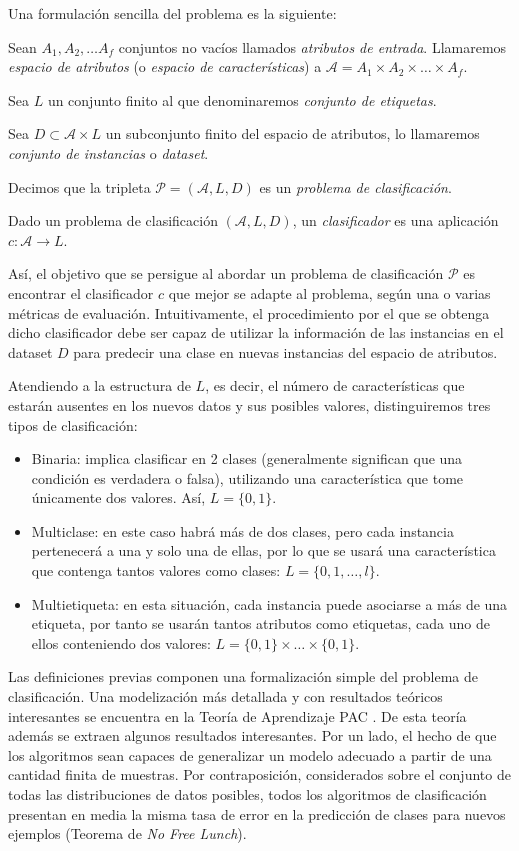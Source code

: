 Una formulación sencilla del problema es la siguiente:

Sean \(A_1, A_2, \dots A_f\) conjuntos no vacíos llamados
\emph{atributos de entrada}. Llamaremos \emph{espacio de atributos} (o
\emph{espacio de características}) a
\(\mathcal A=A_1\times A_2\times\dots\times A_f\).

Sea $L$ un conjunto finito al que denominaremos \emph{conjunto de etiquetas}.

Sea \(D\subset \mathcal A\times L\) un subconjunto finito del espacio de
atributos, lo llamaremos \emph{conjunto de instancias} o \emph{dataset}.

Decimos que la tripleta \(\mathcal P=\left(\mathcal A, L, D\right)\) es
un \emph{problema de clasificación}. 

Dado un problema de clasificación \(\left(\mathcal A, L, D\right)\), un
\emph{clasificador} es una aplicación \(c:\mathcal A\rightarrow L\).

Así, el objetivo que se persigue al abordar un problema de clasificación
\(\mathcal P\) es encontrar el clasificador \(c\) que mejor se adapte al
problema, según una o varias métricas de evaluación. Intuitivamente, el
procedimiento por el que se obtenga dicho clasificador debe ser capaz de
utilizar la información de las instancias en el dataset \(D\) para
predecir una clase en nuevas instancias del espacio de atributos.

Atendiendo a la estructura de $L$, es decir, el número de características que estarán ausentes en los nuevos datos y sus posibles valores, distinguiremos tres tipos de clasificación:
\begin{itemize}
\item Binaria: implica clasificar en 2 clases (generalmente significan que una condición es verdadera o falsa), utilizando una característica que tome únicamente dos valores. Así, $L = \{0,1\}$.
\item Multiclase: en este caso habrá más de dos clases, pero cada instancia pertenecerá a una y solo una de ellas, por lo que se usará una característica que contenga tantos valores como clases: $L=\{0, 1,\dots, l\}$.
\item Multietiqueta: en esta situación, cada instancia puede asociarse a más de una etiqueta, por tanto se usarán tantos atributos como etiquetas, cada uno de ellos conteniendo dos valores: $L=\{0,1\}\times\dots\times\{0,1\}$.
\end{itemize}


Las definiciones previas componen una formalización simple del problema
de clasificación. Una modelización más detallada y con resultados
teóricos interesantes se encuentra en la Teoría de Aprendizaje PAC
\autocite{shwartz2014}. De esta teoría además se extraen algunos resultados
interesantes. Por un lado, el hecho de que los algoritmos sean capaces de generalizar
un modelo adecuado a partir de una cantidad finita de muestras. Por contraposición,
considerados sobre el conjunto de todas las distribuciones de datos
posibles, todos los algoritmos de clasificación presentan en media la
misma tasa de error en la predicción de clases para nuevos ejemplos
(Teorema de \textit{No Free Lunch}).

